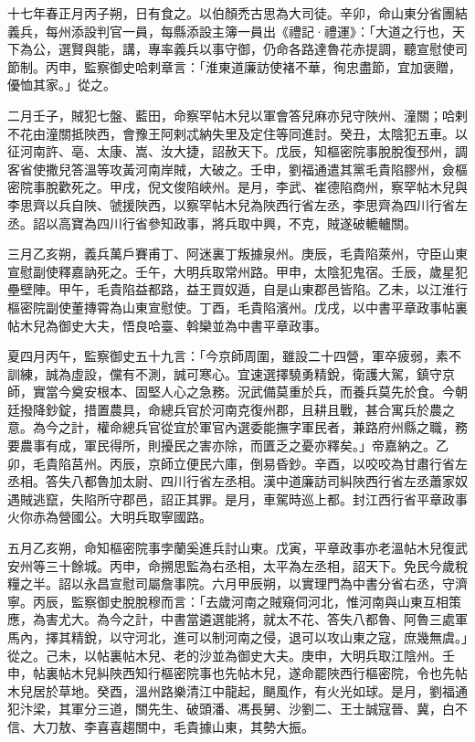 
\begin{pinyinscope}

 十七年春正月丙子朔，日有食之。以伯顏禿古思為大司徒。辛卯，命山東分省團結義兵，每州添設判官一員，每縣添設主簿一員出《禮記·禮運》：「大道之行也，天下為公，選賢與能，講，專率義兵以事守御，仍命各路達魯花赤提調，聽宣慰使司節制。丙申，監察御史哈剌章言：「淮東道廉訪使褚不華，徇忠盡節，宜加褒贈，優恤其家。」從之。



 二月壬子，賊犯七盤、藍田，命察罕帖木兒以軍會答兒麻亦兒守陜州、潼關；哈剌不花由潼關抵陜西，會豫王阿剌忒納失里及定住等同進討。癸丑，太陰犯五車。以征河南許、亳、太康、嵩、汝大捷，詔赦天下。戊辰，知樞密院事脫脫復邳州，調客省使撒兒答溫等攻黃河南岸賊，大破之。壬申，劉福通遣其黨毛貴陷膠州，僉樞密院事脫歡死之。甲戌，倪文俊陷峽州。是月，李武、崔德陷商州，察罕帖木兒與李思齊以兵自陜、虢援陜西，以察罕帖木兒為陜西行省左丞，李思齊為四川行省左丞。詔以高寶為四川行省參知政事，將兵取中興，不克，賊遂破轆轤關。



 三月乙亥朔，義兵萬戶賽甫丁、阿迷裏丁叛據泉州。庚辰，毛貴陷萊州，守臣山東宣慰副使釋嘉訥死之。壬午，大明兵取常州路。甲申，太陰犯鬼宿。壬辰，歲星犯壘壁陣。甲午，毛貴陷益都路，益王買奴遁，自是山東郡邑皆陷。乙未，以江淮行樞密院副使董摶霄為山東宣慰使。丁酉，毛貴陷濱州。戊戌，以中書平章政事帖裏帖木兒為御史大夫，悟良哈臺、斡欒並為中書平章政事。



 夏四月丙午，監察御史五十九言：「今京師周圍，雖設二十四營，軍卒疲弱，素不訓練，誠為虛設，儻有不測，誠可寒心。宜速選擇驍勇精銳，衛護大駕，鎮守京師，實當今奠安根本、固堅人心之急務。況武備莫重於兵，而養兵莫先於食。今朝廷撥降鈔錠，措置農具，命總兵官於河南克復州郡，且耕且戰，甚合寓兵於農之意。為今之計，權命總兵官從宜於軍官內選委能撫字軍民者，兼路府州縣之職，務要農事有成，軍民得所，則擾民之害亦除，而匱乏之憂亦釋矣。」帝嘉納之。乙卯，毛貴陷莒州。丙辰，京師立便民六庫，倒易昏鈔。辛酉，以咬咬為甘肅行省左丞相。答失八都魯加太尉、四川行省左丞相。漢中道廉訪司糾陜西行省左丞蕭家奴遇賊逃竄，失陷所守郡邑，詔正其罪。是月，車駕時巡上都。封江西行省平章政事火你赤為營國公。大明兵取寧國路。



 五月乙亥朔，命知樞密院事孛蘭奚進兵討山東。戊寅，平章政事亦老溫帖木兒復武安州等三十餘城。丙申，命搠思監為右丞相，太平為左丞相，詔天下。免民今歲稅糧之半。詔以永昌宣慰司屬詹事院。六月甲辰朔，以實理門為中書分省右丞，守濟寧。丙辰，監察御史脫脫穆而言：「去歲河南之賊窺伺河北，惟河南與山東互相策應，為害尤大。為今之計，中書當遴選能將，就太不花、答失八都魯、阿魯三處軍馬內，擇其精銳，以守河北，進可以制河南之侵，退可以攻山東之寇，庶幾無虞。」從之。己未，以帖裏帖木兒、老的沙並為御史大夫。庚申，大明兵取江陰州。壬申，帖裏帖木兒糾陜西知行樞密院事也先帖木兒，遂命罷陜西行樞密院，令也先帖木兒居於草地。癸酉，溫州路樂清江中龍起，颶風作，有火光如球。是月，劉福通犯汴梁，其軍分三道，關先生、破頭潘、馮長舅、沙劉二、王士誠寇晉、冀，白不信、大刀敖、李喜喜趨關中，毛貴據山東，其勢大振。




\end{pinyinscope}
